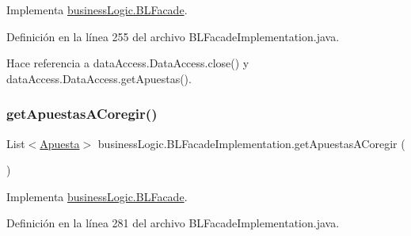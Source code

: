 Implementa \mbox{\hyperlink{interfacebusinessLogic_1_1BLFacade_ae1f0952366adb9a51b00889e7be9cf11}{business\+Logic.\+B\+L\+Facade}}.



Definición en la línea 255 del archivo B\+L\+Facade\+Implementation.\+java.


\begin{DoxyCode}{0}

\end{DoxyCode}


Hace referencia a data\+Access.\+Data\+Access.\+close() y data\+Access.\+Data\+Access.\+get\+Apuestas().

\mbox{\label{classbusinessLogic_1_1BLFacadeImplementation_af1218f1db76137f821a31adc31f47e9f}} 
\subsubsection{\texorpdfstring{getApuestasACoregir()}{getApuestasACoregir()}}
{\footnotesize\ttfamily List$<$\mbox{\hyperlink{classdomain_1_1Apuesta}{Apuesta}}$>$ business\+Logic.\+B\+L\+Facade\+Implementation.\+get\+Apuestas\+A\+Coregir (\begin{DoxyParamCaption}{ }\end{DoxyParamCaption})}



Implementa \mbox{\hyperlink{interfacebusinessLogic_1_1BLFacade_a7cd14457ed6f9b5aaef992f780a51c20}{business\+Logic.\+B\+L\+Facade}}.



Definición en la línea 281 del archivo B\+L\+Facade\+Implementation.\+java.


